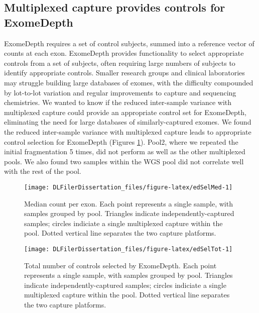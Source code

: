 \documentclass[11pt,letterpaper,oneside]{book}
\begin{document}
\hypertarget{multiplexed-capture-provides-controls-for-exomedepth}{%
\subsection{Multiplexed capture provides controls for ExomeDepth}\label{multiplexed-capture-provides-controls-for-exomedepth}}

ExomeDepth requires a set of control subjects, summed into a reference vector of counts at each exon.
ExomeDepth provides functionality to select appropriate controls from a set of subjects, often requiring large numbers of subjects to identify appropriate controls.
Smaller research groups and clinical laboratories may struggle building large databases of exomes, with the difficulty compounded by lot-to-lot variation and regular improvements to capture and sequencing chemistries.
We wanted to know if the reduced inter-sample variance with multiplexed capture could provide an appropriate control set for ExomeDepth, eliminating the need for large databases of similarly-captured exomes.
We found the reduced inter-sample variance with multiplexed capture leads to appropriate control selection for ExomeDepth (Figures \ref{fig:edSelMed}).
Pool2, where we repeated the initial fragmentation 5 times, did not perform as well as the other multiplexed pools.
We also found two samples within the WGS pool did not correlate well with the rest of the pool.





\begin{figure}

{\centering \texttt{[image: DLFilerDissertation\_files/figure-latex/edSelMed-1]} 

}

\caption[Median count per exon.]{Median count per exon. Each point represents a single sample, with samples grouped by pool. Triangles indicate independently-captured samples; circles indiciate a single multiplexed capture within the pool. Dotted vertical line separates the two capture platforms.}\label{fig:edSelMed}
\end{figure}



\begin{figure}

{\centering \texttt{[image: DLFilerDissertation\_files/figure-latex/edSelTot-1]} 

}

\caption[Total number of controls selected by ExomeDepth.]{Total number of controls selected by ExomeDepth. Each point represents a single sample, with samples grouped by pool. Triangles indicate independently-captured samples; circles indiciate a single multiplexed capture within the pool. Dotted vertical line separates the two capture platforms.}\label{fig:edSelTot}
\end{figure}
\end{document}
